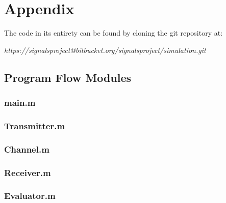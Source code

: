 \chapter*{Appendix}
The code in its entirety can be found by cloning the git repository at:
\begin{center}
\emph{https://signalsproject@bitbucket.org/signalsproject/simulation.git}
\end{center}
\section*{Program Flow Modules}
\subsection*{main.m}
\begin{spacing}{1}
	\small
	
\end{spacing}

\subsection*{Transmitter.m}
\begin{spacing}{1}
	\small
	
\end{spacing}

\subsection*{Channel.m}
\begin{spacing}{1}
	\small
	
\end{spacing}

\subsection*{Receiver.m}
\begin{spacing}{1}
	\small
	
\end{spacing}

\subsection*{Evaluator.m}
\begin{spacing}{1}
	\small
	
\end{spacing}
